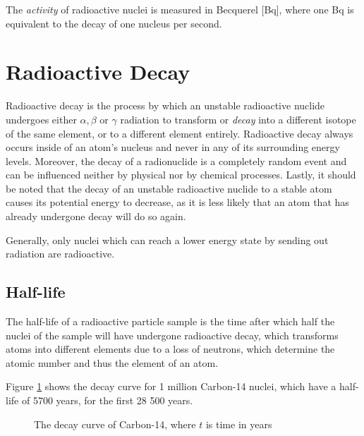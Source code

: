 The \emph{activity} of radioactive nuclei is measured in Becquerel [Bq], where one Bq is equivalent to the decay of one nucleus per second.

\pagebreak

\chapter*{Radioactive Decay}

Radioactive decay is the process by which an unstable radioactive nuclide undergoes either $\alpha, \beta$ or $\gamma$ radiation to transform or \emph{decay} into a different isotope of the same element, or to a different element entirely. Radioactive decay always occurs inside of an atom's nucleus and never in any of its surrounding energy levels. Moreover, the decay of a radionuclide is a completely random event and can be influenced neither by physical nor by chemical processes. Lastly, it should be noted that the decay of an unstable radioactive nuclide to a stable atom causes its potential energy to decrease, as it is less likely that an atom that has already undergone decay will do so again.

Generally, only nuclei which can reach a lower energy state by sending out radiation are radioactive.

\section*{Half-life}

The half-life of a radioactive particle sample is the time after which half the nuclei of the sample will have undergone radioactive decay, which transforms atoms into different elements due to a loss of neutrons, which determine the atomic number and thus the element of an atom. 

Figure \ref{fig:decay} shows the decay curve for 1 million Carbon-14 nuclei, which have a half-life of 5700 years, for the first 28 500 years.

\begin{figure}[h!]
\centering
\caption{The decay curve of Carbon-14, where $t$ is time in years}
\label{fig:decay}
\end{figure}

